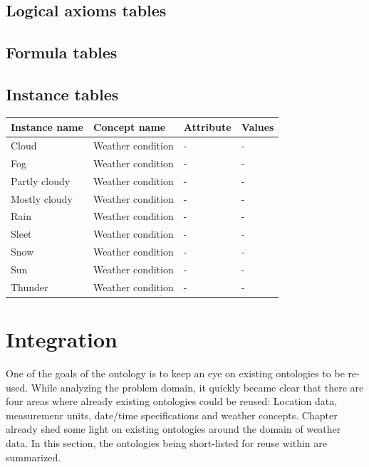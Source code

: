 \subsection{Logical axioms tables}


\subsection{Formula tables}


\subsection{Instance tables}

\begin{longtable}{|p{}|p{}|p{}|p{}|}
  \hline
  \textbf{Instance name} & \textbf{Concept name} & \textbf{Attribute} & \textbf{Values} \\
  \hline\hline
  Cloud & Weather condition & - & - \\
  \hline
  Fog & Weather condition & - & - \\
  \hline
  Partly cloudy & Weather condition & - & - \\
  \hline
  Mostly cloudy & Weather condition & - & - \\
  \hline
  Rain & Weather condition & - & - \\
  \hline
  Sleet & Weather condition & - & - \\
  \hline
  Snow & Weather condition & - & - \\
  \hline
  Sun & Weather condition & - & - \\
  \hline
  Thunder & Weather condition & - & - \\
  \hline
\end{longtable}

\section{Integration}
\label{sec:integration}

One of the goals of the \thinkhomeweather ontology is to keep an eye on existing ontologies to be re-used. While analyzing the problem domain, it quickly became clear that there are four areas where already existing ontologies could be reused: Location data, measuremenr units, date/time specifications and weather concepts. Chapter \label{ch:existing_work} already shed some light on existing ontologies around the domain of weather data. In this section, the ontologies being short-listed for reuse within \thinkhomeweather are summarized.

